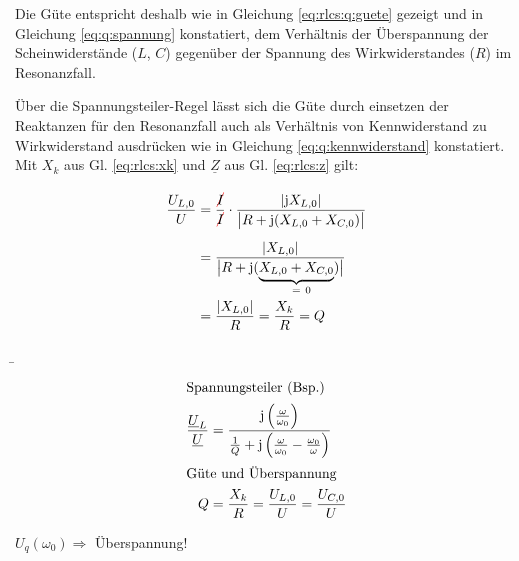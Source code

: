 \begin{frame}
{    Die Güte entspricht deshalb wie in Gleichung \ref{eq:rlcs:q:guete} gezeigt und in Gleichung \ref{eq:q:spannung} konstatiert, 
    dem Verhältnis der Überspannung der Scheinwiderstände ($L$, $C$) gegenüber der Spannung des Wirkwiderstandes ($R$) im Resonanzfall.

    Über die Spannungsteiler-Regel lässt sich die Güte durch einsetzen der Reaktanzen für den Resonanzfall auch als Verhältnis von 
    Kennwiderstand zu Wirkwiderstand ausdrücken wie in Gleichung \ref{eq:q:kennwiderstand} konstatiert. 
    Mit $X_k$ aus Gl. \ref{eq:rlcs:xk} und $\underline{Z}$ aus Gl. \ref{eq:rlcs:z} gilt:

    \begin{equation}\begin{aligned}
        \frac{U_{L,0}}{U}
        &= \frac{\redcancel{I}}{\redcancel{I}} \cdot \frac{|\mathrm{j}X_{L,0}|}{\big|R + \mathrm{j}(X_{L,0}+X_{C,0})\big|}\vphantom{\Bigg|}\\
        &= \frac{|X_{L,0}|}{ \big|R + \mathrm{j}( \underbrace{X_{L,0} + X_{C,0}}_{=\mathrlap{\ 0}})\big|}\vphantom{\Bigg|}\\
        &= \frac{|X_{L,0}|}{R} = \frac{X_k}{R} = Q
    \end{aligned}\end{equation}
}
\b{%
\begin{minipage}{0.3\textwidth}%
\begin{align}
        \intertext{Spannungsteiler (Bsp.)}
    \frac{\underline{U}_L}{\underline{U}} &= \frac{\mathrm{j}\left(\frac{\omega}{\omega_0}\right)}{\frac{1}{Q}+\mathrm{j}\left(\frac{\omega}{\omega_0}-\frac{\omega_0}{\omega}\right)}\\
        \intertext{Güte und Überspannung}
    Q &= \frac{X_k}{R} = \frac{U_{L,0}}{U} = \frac{U_{C,0}}{U}
\end{align}
\end{minipage}\hfill%
\begin{minipage}{0.65\textwidth}\centering
    \newline%
    $U_q(\omega_0) \Rightarrow$ Überspannung!
\end{minipage}
}
\end{frame}


